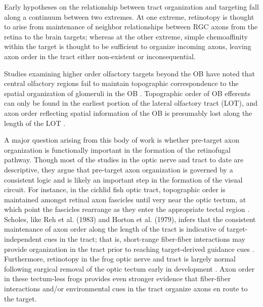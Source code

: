 Early hypotheses on the relationship between tract organization and targeting fall along a continuum between two extremes.
At one extreme, retinotopy is thought to arise from maintenance of neighbor relationships between RGC axons from the retina to the brain targets; whereas at the other extreme, simple chemoaffinity within the target is thought to be sufficient to organize incoming axons, leaving axon order in the tract either non-existent or inconsequential.


Studies examining higher order olfactory targets beyond the OB have noted that central olfactory regions fail to maintain topographic correspondence to the spatial organization of glomeruli in the OB \cite{luskin1982distribution,sosulski2011distinct}.
Topographic order of OB efferents can only be found in the earliest portion of the lateral olfactory tract (LOT), and axon order reflecting spatial information of the OB is presumably lost along the length of the LOT \cite{price1975observation}.


A major question arising from this body of work is whether pre-target axon organization is functionally important in the formation of the retinofugal pathway.
Though most of the studies in the optic nerve and tract to date are descriptive, they argue that pre-target axon organization is governed by a consistent logic and is likely an important step in the formation of the visual circuit.
For instance, in the cichlid fish optic tract, topographic order is maintained amongst retinal axon fascicles until very near the optic tectum, at which point the fascicles rearrange as they enter the appropriate tectal region \cite{scholes1979nerve}.
Scholes, like Reh et al. (1983) and Horton et al. (1979), infers that the consistent maintenance of axon order along the length of the tract is indicative of target-independent cues in the tract; that is, short-range fiber-fiber interactions may provide organization in the tract prior to reaching target-derived guidance cues \cite{scholes1979nerve}.
Furthermore, retinotopy in the frog optic nerve and tract is largely normal following surgical removal of the optic tectum early in development \cite{reh1983organization}.
Axon order in these tectum-less frogs provides even stronger evidence that fiber-fiber interactions and/or environmental cues in the tract organize axons en route to the target.

